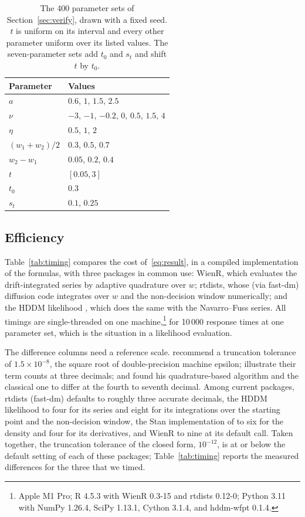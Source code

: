 \documentclass[final,5p,times,twocolumn,authoryear]{elsarticle}
\begin{document}
\begin{table}[t]
\centering
\caption{The 400 parameter sets of Section~\ref{sec:verify}, drawn with a fixed seed. $t$ is uniform on its interval and every other parameter uniform over its listed values. The seven-parameter sets add $t_0$ and $s_t$ and shift $t$ by $t_0$.}
\label{tab:grid}
\begin{tabular}{ll}
\toprule
Parameter & Values \\
\midrule
$a$ & $0.6$, $1$, $1.5$, $2.5$ \\
$\nu$ & $-3$, $-1$, $-0.2$, $0$, $0.5$, $1.5$, $4$ \\
$\eta$ & $0.5$, $1$, $2$ \\
$(w_1 + w_2)/2$ & $0.3$, $0.5$, $0.7$ \\
$w_2 - w_1$ & $0.05$, $0.2$, $0.4$ \\
$t$ & $[0.05, 3]$ \\
\midrule
$t_0$ & $0.3$ \\
$s_t$ & $0.1$, $0.25$ \\
\bottomrule
\end{tabular}
\end{table}


\subsection{Efficiency}

Table~\ref{tab:timing} compares the cost of~\eqref{eq:result}, in a compiled implementation of the formulas, with three packages in common use: WienR, which evaluates the drift-integrated series by adaptive quadrature over $w$; rtdists, whose (via fast-dm) diffusion code integrates over $w$ and the non-decision window numerically; and the HDDM likelihood \citep{Wiecki2013, hddmwfpt}, which does the same with the Navarro--Fuss series. All timings are single-threaded on one machine,\footnote{Apple M1 Pro; R 4.5.3 with WienR 0.3-15 and rtdists 0.12-0; Python 3.11 with NumPy 1.26.4, SciPy 1.13.1, Cython 3.1.4, and hddm-wfpt 0.1.4.} for 10\,000 response times at one parameter set, which is the situation in a likelihood evaluation.

The difference columns need a reference scale. \citet{Blurton2017} recommend a truncation tolerance of $1.5\times10^{-8}$, the square root of double-precision machine epsilon; \citet{Gondan2014} illustrate their term counts at three decimals; and \citet[Table~1]{Tuerlinckx2004} found his quadrature-based algorithm and the classical one to differ at the fourth to seventh decimal. Among current packages, rtdists (fast-dm) defaults to roughly three accurate decimals, the HDDM likelihood to four for its series and eight for its integrations over the starting point and the non-decision window, the Stan implementation of \citet{Henrich2024} to six for the density and four for its derivatives, and WienR to nine at its default call. Taken together, the truncation tolerance of the closed form, $10^{-12}$, is at or below the default setting of each of these packages; Table~\ref{tab:timing} reports the measured differences for the three that we timed.
\end{document}
